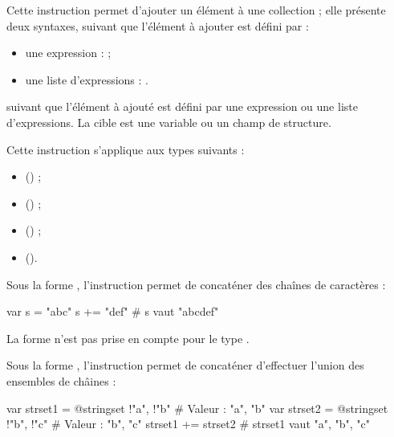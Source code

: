 
Cette instruction permet d'ajouter un élément à une collection ; elle présente deux syntaxes, suivant que l'élément à ajouter est défini par :
\begin{itemize}
  \item une expression :  ;
  \item une liste d'expressions : .
\end{itemize}


 suivant que l'élément à ajouté est défini par une expression ou une liste d'expressions. La cible est une variable ou un champ de structure.

Cette instruction s'applique aux types suivants :
\begin{itemize}
  \item {} () ;
  \item {} () ;
  \item {} () ;
  \item {} ().
\end{itemize}



Sous la forme , l'instruction permet de concaténer des chaînes de caractères :
\begin{galgascode}
var s = "abc"
s += "def" # s vaut "abcdef"
\end{galgascode}

La forme  n'est pas prise en compte pour le type .




Sous la forme , l'instruction permet de concaténer d'effectuer l'union des ensembles de châines :
\begin{galgascode}
var strset1 = @stringset {!"a", !"b"} # Valeur : "a", "b"
var strset2 = @stringset {!"b", !"c"} # Valeur : "b", "c"
strset1 += strset2 # strset1 vaut "a", "b", "c"
\end{galgascode}

